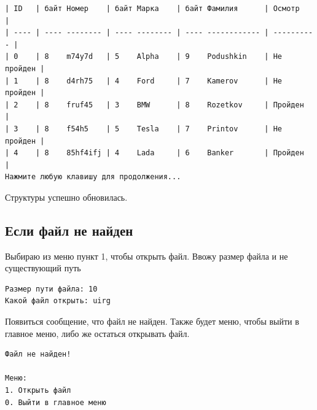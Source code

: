 \begin{tcolorbox}
\begin{verbatim}
| ID   | байт Номер    | байт Марка    | байт Фамилия      | Осмотр     |
| ---- | ---- -------- | ---- -------- | ---- ------------ | ---------- |
| 0    | 8    m74y7d   | 5    Alpha    | 9    Podushkin    | Не пройден |
| 1    | 8    d4rh75   | 4    Ford     | 7    Kamerov      | Не пройден |
| 2    | 8    fruf45   | 3    BMW      | 8    Rozetkov     | Пройден    |
| 3    | 8    f54h5    | 5    Tesla    | 7    Printov      | Не пройден |
| 4    | 8    85hf4ifj | 4    Lada     | 6    Banker       | Пройден    |
Нажмите любую клавишу для продолжения...   
\end{verbatim}
\end{tcolorbox}

Структуры успешно обновилась.

\subsection{Если файл не найден}

Выбираю из меню пункт 1, чтобы открыть файл. Ввожу размер файла и не существующий путь

\begin{tcolorbox}
\begin{verbatim}
Размер пути файла: 10
Какой файл открыть: uirg
\end{verbatim}
\end{tcolorbox}

Появиться сообщение, что файл не найден. Также будет меню, чтобы выйти в главное меню, либо же остаться открывать файл.

\begin{tcolorbox}
\begin{verbatim}
Файл не найден!

Меню:
1. Открыть файл
0. Выйти в главное меню
\end{verbatim}
\end{tcolorbox}
